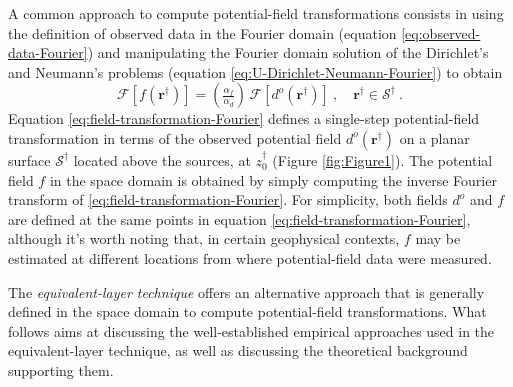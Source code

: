 A common approach to compute potential-field transformations \cite[e.g.,][]{gunn1975} 
consists in using the definition of observed data in the Fourier domain (equation \ref{eq:observed-data-Fourier}) 
and manipulating the Fourier domain solution of the Dirichlet's and Neumann's problems 
(equation \ref{eq:U-Dirichlet-Neumann-Fourier}) to obtain
\begin{equation}
	\mathcal{F} [ f(\mathbf{r}^{\dagger}) ] =
	\left( \tfrac{\alpha_{f}}{\alpha_{d}} \right) \, \mathcal{F} \left[ d^{o}(\mathbf{r}^{\dagger}) \right] \: , 
	\quad \mathbf{r}^{\dagger} \in \mathcal{S}^{\dagger} \: .
	\label{eq:field-transformation-Fourier}
\end{equation}
Equation \ref{eq:field-transformation-Fourier} defines a single-step potential-field transformation 
in terms of the observed potential field $d^{o}(\mathbf{r}^{\dagger})$ on a planar surface $\mathcal{S}^{\dagger}$ 
located above the sources, at $z^{\dagger}_{0}$ (Figure \ref{fig:Figure1}). 
The potential field $f$ in the space domain is obtained by simply computing the inverse Fourier 
transform of \ref{eq:field-transformation-Fourier}.
For simplicity, both fields $d^o$ and $f$ are defined at the same points in equation \ref{eq:field-transformation-Fourier}, 
although it's worth noting that, in certain geophysical contexts, $f$ may be estimated at different locations from 
where potential-field data were measured.

The \textit{equivalent-layer technique} offers an alternative approach that is generally defined in the 
space domain to compute potential-field transformations. What follows aims at discussing the well-established 
empirical approaches used in the equivalent-layer technique, as well as discussing the theoretical background 
supporting them.